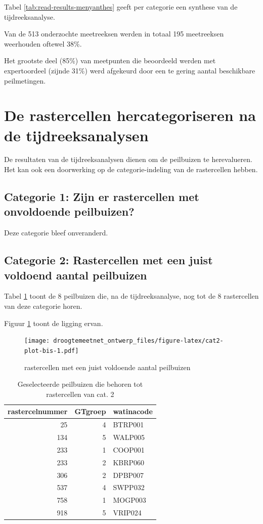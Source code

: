 \documentclass[11pt,]{book}
\begin{document}
Tabel \ref{tab:read-results-menyanthes} geeft per categorie een synthese
van de tijdreeksanalyse.

Van de 513 onderzochte meetreeksen werden in totaal 195 meetreeksen
weerhouden oftewel 38\%.

Het grootste deel (85\%) van meetpunten die beoordeeld werden met
expertoordeel (zijnde 31\%) werd afgekeurd door een te gering aantal
beschikbare peilmetingen.

\section{De rastercellen hercategoriseren na de
tijdreeksanalysen}\label{de-rastercellen-hercategoriseren-na-de-tijdreeksanalysen}

De resultaten van de tijdreeksanalysen dienen om de peilbuizen te
herevalueren. Het kan ook een doorwerking op de categorie-indeling van
de rastercellen hebben.

\subsection{Categorie 1: Zijn er rastercellen met onvoldoende
peilbuizen?}\label{categorie-1-zijn-er-rastercellen-met-onvoldoende-peilbuizen-1}

Deze categorie bleef onveranderd.

\subsection{Categorie 2: Rastercellen met een juist voldoend aantal
peilbuizen}\label{cat2}

Tabel \ref{tab:tubes-cat2-bis} toont de 8 peilbuizen die, na de
tijdreeksanalyse, nog tot de 8 rastercellen van deze categorie horen.

Figuur \ref{fig:cat2-plot-bis} toont de ligging ervan.

\begin{figure}
\centering
\texttt{[image: droogtemeetnet\_ontwerp\_files/figure-latex/cat2-plot-bis-1.pdf]}
\caption{\label{fig:cat2-plot-bis}rastercellen met een juist voldoende
aantal peilbuizen}
\end{figure}

\begin{table}

\caption{\label{tab:tubes-cat2-bis}Geselecteerde peilbuizen die behoren tot rastercellen van cat. 2}
\centering
\begin{tabular}[t]{r|r|l}
\hline
rastercelnummer & GTgroep & watinacode\\
\hline
25 & 4 & BTRP001\\
\hline
134 & 5 & WALP005\\
\hline
233 & 1 & COOP001\\
\hline
233 & 2 & KBRP060\\
\hline
306 & 2 & DPBP007\\
\hline
537 & 4 & SWPP032\\
\hline
758 & 1 & MOGP003\\
\hline
918 & 5 & VRIP024\\
\hline
\end{tabular}
\end{table}
\end{document}
